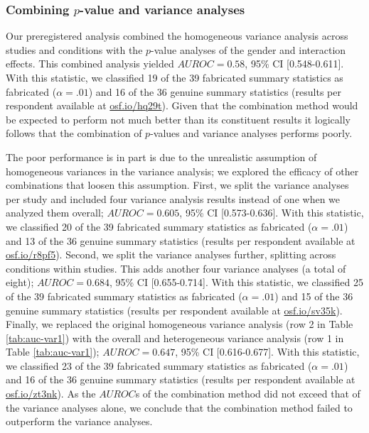 \documentclass[a5paper]{book}
\begin{document}
\subsubsection{\texorpdfstring{Combining \(p\)-value and variance
analyses}{Combining p-value and variance analyses}}\label{combining-p-value-and-variance-analyses}

Our preregistered analysis combined the homogeneous variance analysis
across studies and conditions with the \(p\)-value analyses of the
gender and interaction effects. This combined analysis yielded
\(AUROC=0.58\), 95\% CI {[}0.548-0.611{]}. With this statistic, we
classified 19 of the 39 fabricated summary statistics as fabricated
(\(\alpha=.01\)) and 16 of the 36 genuine summary statistics (results
per respondent available at \href{https://osf.io/hq29t}{osf.io/hq29t}).
Given that the combination method would be expected to perform not much
better than its constituent results it logically follows that the
combination of \(p\)-values and variance analyses performs poorly.

The poor performance is in part is due to the unrealistic assumption of
homogeneous variances in the variance analysis; we explored the efficacy
of other combinations that loosen this assumption. First, we split the
variance analyses per study and included four variance analysis results
instead of one when we analyzed them overall; \(AUROC=0.605\), 95\% CI
{[}0.573-0.636{]}. With this statistic, we classified 20 of the 39
fabricated summary statistics as fabricated (\(\alpha=.01\)) and 13 of
the 36 genuine summary statistics (results per respondent available at
\href{https://osf.io/r8pf5}{osf.io/r8pf5}). Second, we split the
variance analyses further, splitting across conditions within studies.
This adds another four variance analyses (a total of eight);
\(AUROC=0.684\), 95\% CI {[}0.655-0.714{]}. With this statistic, we
classified 25 of the 39 fabricated summary statistics as fabricated
(\(\alpha=.01\)) and 15 of the 36 genuine summary statistics (results
per respondent available at \href{https://osf.io/sv35k}{osf.io/sv35k}).
Finally, we replaced the original homogeneous variance analysis (row 2
in Table \ref{tab:auc-var1}) with the overall and heterogeneous variance
analysis (row 1 in Table \ref{tab:auc-var1}); \(AUROC=0.647\), 95\% CI
{[}0.616-0.677{]}. With this statistic, we classified 23 of the 39
fabricated summary statistics as fabricated (\(\alpha=.01\)) and 16 of
the 36 genuine summary statistics (results per respondent available at
\href{https://osf.io/zt3nk}{osf.io/zt3nk}). As the \(AUROC\)s of the
combination method did not exceed that of the variance analyses alone,
we conclude that the combination method failed to outperform the
variance analyses.
\end{document}
